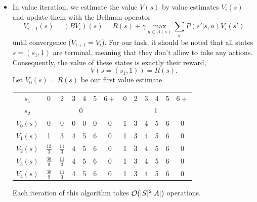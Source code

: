 \documentclass[11pt, a4paper]{article}
\begin{document}
\begin{enumerate}
\begin{solution}
        \begin{itemize}
            \item In value iteration, we estimate the value $V(s)$ by value estimates $V_i(s)$ and update them with the Bellman operator
            \begin{equation*}
                V_{i+1}(s) = (B V_i)(s) = R(s) + \gamma \max_{a \in A(s)} \sum_{s'} P(s' | s, a) V_{i}(s')
            \end{equation*}
            until convergence ($V_{i + 1} = V_i$). For our task, it should be noted that all states $s = (s_1, 1)$ are terminal, meaning that they don't allow to take any actions. Consequently, the value of these states is exactly their reward, \ie{}
            \begin{equation*}
                V(s = (s_1, 1)) = R(s) .
            \end{equation*}
            Let $V_0(s) = R(s)$ be our first value estimate.

            \begin{table}[h]
                \centering
                \begin{tabular}{c|cccccc|cccccc}
                    \toprule
                    $s_1$    & 0 & 2 & 3 & 4 & 5 & $6+$ & 0 & 2 & 3 & 4 & 5 & $6+$ \\
                    $s_2$    & \multicolumn{6}{c|}{0}   & \multicolumn{6}{c}{1}    \\
                    \midrule
                    $V_0(s)$ & 0 & 0 & 0 & 0 & 0 & 0    & 1 & 3 & 4 & 5 & 6 & 0    \\
                    $V_1(s)$ & 1 & 3 & 4 & 5 & 6 & 0    & 1 & 3 & 4 & 5 & 6 & 0    \\
                    $V_2(s)$ & $\frac{12}{3}$ & $\frac{11}{3}$ & 4 & 5 & 6 & 0 & 1 & 3 & 4 & 5 & 6 & 0 \\
                    $V_3(s)$ & $\frac{38}{9}$ & $\frac{11}{3}$ & 4 & 5 & 6 & 0 & 1 & 3 & 4 & 5 & 6 & 0 \\
                    $V_4(s)$ & $\frac{38}{9}$ & $\frac{11}{3}$ & 4 & 5 & 6 & 0 & 1 & 3 & 4 & 5 & 6 & 0 \\
                    \bottomrule
                \end{tabular}
            \end{table}

            Each iteration of this algorithm takes $\mathcal{O}(\lvert S\rvert^2 \lvert A\rvert)$ operations.


\end{itemize}
\end{solution}
\end{enumerate}
\end{document}
